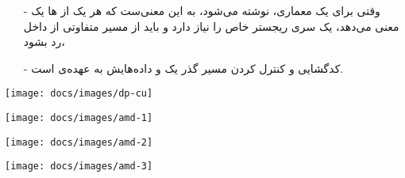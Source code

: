 \begin{frame}{}
\begin{itemize}\itemr
\item[-]
وقتی برای یک معماری، 
نوشته می‌شود، به این معنی‌ست که هر یک از 
ها یک معنی می‌دهد، یک سری ریجستر خاص را نیاز دارد و باید از مسیر متفاوتی از داخل 
رد بشود،
\item[-]
کدگشایی و کنترل کردن مسیر گذر یک 
و داده‌هایش به عهده‌ی 
است.
\end{itemize}
\end{frame}

\begin{frame}{}
\begin{center}
\texttt{[image: docs/images/dp-cu]}
\end{center}
\end{frame}

\begin{frame}{}
\begin{center}
\texttt{[image: docs/images/amd-1]}
\end{center}
\end{frame}

\begin{frame}{}
\begin{center}
\texttt{[image: docs/images/amd-2]}
\end{center}
\end{frame}

\begin{frame}{}
\begin{center}
\texttt{[image: docs/images/amd-3]}
\end{center}
\end{frame}
